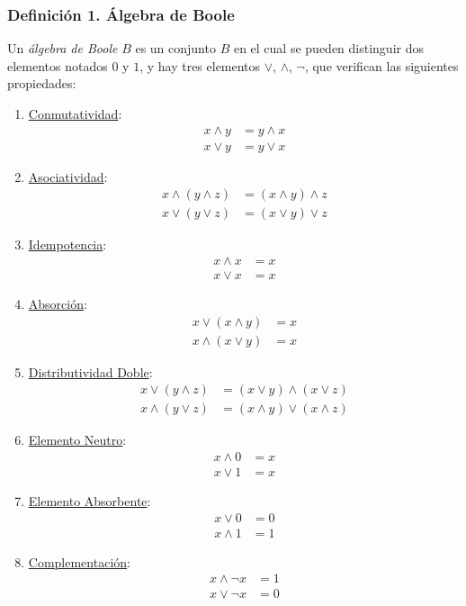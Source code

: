 \documentclass{article}
\newcommand{\comma}{,\,}                                %
\begin{document}
\subsubsection*{Definición 1. Álgebra de Boole}
Un \emph{álgebra de Boole} $B$ es un conjunto $B$ en el cual se pueden distinguir dos elementos notados $0$ y $1$, 
y hay tres elementos $\vee \comma \wedge \comma \neg$, que verifican las siguientes propiedades:
\begin{enumerate}
    \item \underline{Conmutatividad}:
    \begin{align*}
        x \wedge y &= y \wedge x\\
        x \vee y &= y \vee x
    \end{align*}
    \item \underline{Asociatividad}:
    \begin{align*}
        x \wedge (y \wedge z) &= (x \wedge y) \wedge z\\
        x \vee (y \vee z) &= (x \vee y) \vee z
    \end{align*}
    \item \underline{Idempotencia}:
    \begin{align*}
        x \wedge x &= x\\
        x \vee x &= x
    \end{align*}
    \item \underline{Absorción}:
    \begin{align*}
        x \vee (x \wedge y) &= x\\
        x \wedge (x \vee y) &= x
    \end{align*}
    \item \underline{Distributividad Doble}:
    \begin{align*}
        x \vee (y \wedge z) &= (x \vee y) \wedge (x \vee z)\\
        x \wedge (y \vee z) &= (x \wedge y) \vee (x \wedge z)
    \end{align*}
    \item \underline{Elemento Neutro}:
    \begin{align*}
        x \wedge 0 &= x\\
        x \vee 1 &= x
    \end{align*}
    \item \underline{Elemento Absorbente}:
    \begin{align*}
        x \vee 0 &= 0\\
        x \wedge 1 &= 1
    \end{align*}
    \item \underline{Complementación}:
    \begin{align*}
        x \wedge \neg x &= 1\\
        x \vee \neg x &= 0
    \end{align*}
\end{enumerate}
\end{document}

